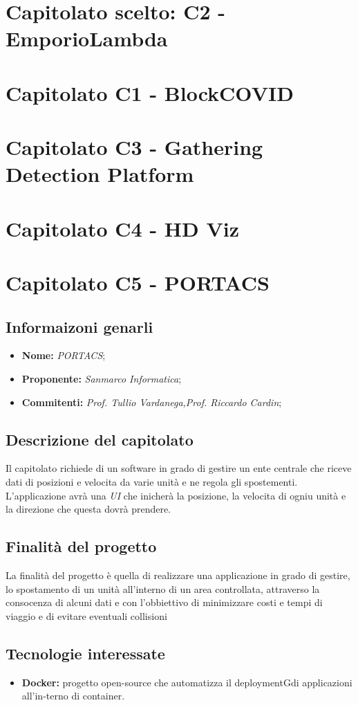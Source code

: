 \documentclass[a4paper]{article}
\begin{document}
\section{Capitolato scelto: C2 -  	EmporioLambda}
\section{Capitolato C1 - BlockCOVID}
\section{Capitolato C3 - Gathering Detection Platform}
\section{Capitolato C4 - HD Viz}
\section{Capitolato C5 - PORTACS}
\subsection{Informaizoni genarli}
\begin{itemize}
    \item \textbf{Nome:} \textit{PORTACS};
    \item \textbf{Proponente:} \textit{Sanmarco Informatica};
    \item \textbf{Commitenti:} \textit{Prof. Tullio Vardanega,Prof. Riccardo Cardin};
\end{itemize}
\subsection{Descrizione del capitolato}
Il capitolato richiede di un software in grado di gestire un ente centrale che riceve dati 
di posizioni e velocita da varie unità e ne regola gli spostementi. L'applicazione avrà una \textit{UI} che inicherà 
la posizione, la velocita di ogniu unità e la direzione che questa dovrà prendere.
\subsection{Finalità del progetto}
La finalità del progetto è quella di realizzare una applicazione in grado di gestire, lo spostamento di un unità all'interno di un area controllata,
attraverso la consocenza di alcuni dati e con l'obbiettivo di minimizzare costi e tempi di viaggio e di evitare eventuali collisioni
\subsection{Tecnologie interessate}
\begin{itemize}
    \item \textbf{Docker:} progetto open-source che automatizza il deploymentGdi applicazioni all’in-terno di container.
\end{itemize}
\end{document}
